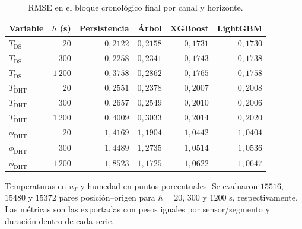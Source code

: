 \begin{table}[htbp]
\centering
\caption{RMSE en el bloque cronológico final por canal y horizonte.}
\label{tab:res_rmse}
\small
\setlength{\tabcolsep}{5pt}
\begin{tabular}{lrrrrr}
\toprule
Variable & $h$ (s) & Persistencia & Árbol & XGBoost & LightGBM \\
\midrule
$T_{\mathrm{DS}}$ & $20$ & $0{,}2122$ & $0{,}2158$ & $0{,}1731$ & $0{,}1730$ \\
$T_{\mathrm{DS}}$ & $300$ & $0{,}2258$ & $0{,}2341$ & $0{,}1743$ & $0{,}1738$ \\
$T_{\mathrm{DS}}$ & $1\,200$ & $0{,}3758$ & $0{,}2862$ & $0{,}1765$ & $0{,}1758$ \\
$T_{\mathrm{DHT}}$ & $20$ & $0{,}2551$ & $0{,}2378$ & $0{,}2007$ & $0{,}2008$ \\
$T_{\mathrm{DHT}}$ & $300$ & $0{,}2657$ & $0{,}2549$ & $0{,}2010$ & $0{,}2006$ \\
$T_{\mathrm{DHT}}$ & $1\,200$ & $0{,}4009$ & $0{,}3033$ & $0{,}2014$ & $0{,}2020$ \\
$\phi_{\mathrm{DHT}}$ & $20$ & $1{,}4169$ & $1{,}1904$ & $1{,}0442$ & $1{,}0404$ \\
$\phi_{\mathrm{DHT}}$ & $300$ & $1{,}4489$ & $1{,}2735$ & $1{,}0514$ & $1{,}0536$ \\
$\phi_{\mathrm{DHT}}$ & $1\,200$ & $1{,}8523$ & $1{,}1725$ & $1{,}0622$ & $1{,}0647$ \\
\bottomrule
\end{tabular}
\par\vspace{3pt}
\begin{minipage}{0.98\textwidth}\footnotesize
Temperaturas en $u_T$ y humedad en puntos porcentuales. Se evaluaron $15516$, $15480$ y $15372$ pares posición--origen para $h=20$, $300$ y $1200$ s, respectivamente. Las métricas son las exportadas con pesos iguales por sensor/segmento y duración dentro de cada serie.
\end{minipage}
\end{table}
